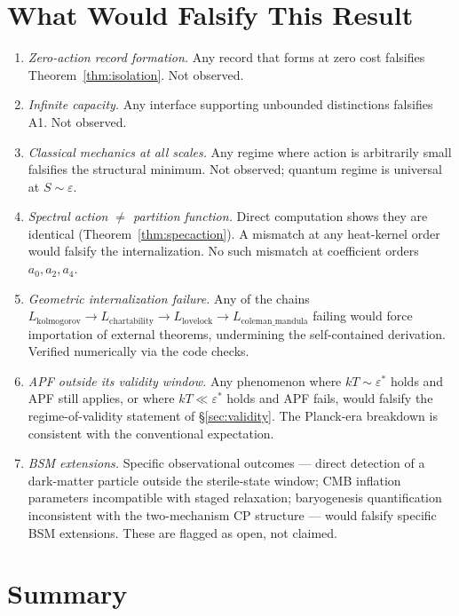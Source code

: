 \documentclass[11pt]{article}
\theoremstyle{definition}
\begin{document}
\section{What Would Falsify This Result}\label{sec:falsify}

\begin{enumerate}
\item[F1] \emph{Zero-action record formation.}  Any record that forms at zero cost falsifies Theorem~\ref{thm:isolation}.  Not observed.
\item[F2] \emph{Infinite capacity.}  Any interface supporting unbounded distinctions falsifies A1.  Not observed.
\item[F3] \emph{Classical mechanics at all scales.}  Any regime where action is arbitrarily small falsifies the structural minimum.  Not observed; quantum regime is universal at $S \sim \varepsilon$.
\item[F4] \emph{Spectral action $\neq$ partition function.}  Direct computation shows they are identical (Theorem~\ref{thm:specaction}).  A mismatch at any heat-kernel order would falsify the internalization.  No such mismatch at coefficient orders $a_0, a_2, a_4$.
\item[F5] \emph{Geometric internalization failure.}  Any of the chains $L_{\mathrm{kolmogorov}} \to L_{\mathrm{chartability}} \to L_{\mathrm{lovelock}} \to L_{\mathrm{coleman\_mandula}}$ failing would force importation of external theorems, undermining the self-contained derivation.  Verified numerically via the code checks.
\item[F6] \emph{APF outside its validity window.}  Any phenomenon where $kT \sim \varepsilon^*$ holds and APF still applies, or where $kT \ll \varepsilon^*$ holds and APF fails, would falsify the regime-of-validity statement of \S\ref{sec:validity}.  The Planck-era breakdown is consistent with the conventional expectation.
\item[F7] \emph{BSM extensions.}  Specific observational outcomes --- direct detection of a dark-matter particle outside the sterile-state window; CMB inflation parameters incompatible with staged relaxation; baryogenesis quantification inconsistent with the two-mechanism CP structure --- would falsify specific BSM extensions.  These are flagged as open, not claimed.
\end{enumerate}

\section{Summary}\label{sec:summary}
\end{document}
